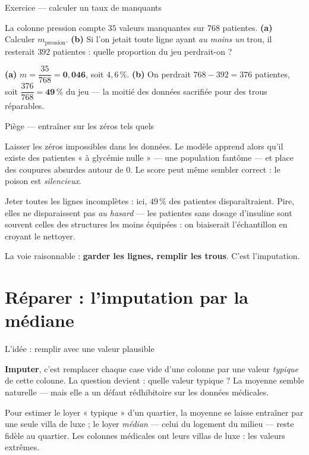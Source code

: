 \documentclass[aspectratio=169,11pt]{beamer}
\begin{document}
\begin{frame}{Exercice — calculer un taux de manquants}
\begin{ucadrec}[Énoncé]
{\small La colonne pression compte $35$ valeurs manquantes sur $768$ patientes. \textbf{(a)} Calculer $m_{\text{pression}}$. \textbf{(b)} Si l'on jetait toute ligne ayant \emph{au moins un} trou, il resterait $392$ patientes : quelle proportion du jeu perdrait-on ?}
\end{ucadrec}
\pause
\begin{ucadex}[Correction]
{\small \textbf{(a)} $m = \dfrac{35}{768} = \mathbf{0{,}046}$, soit $4{,}6\,\%$. \textbf{(b)} On perdrait $768 - 392 = 376$ patientes, soit $\dfrac{376}{768} = \mathbf{49\,\%}$ du jeu — la moitié des données sacrifiée pour des trous réparables.}
\end{ucadex}
\end{frame}

\begin{frame}{Piège — entraîner sur les zéros tels quels}
\begin{ucadpiege}
{\small Laisser les zéros impossibles dans les données. Le modèle apprend alors qu'il existe des patientes « à glycémie nulle » — une population fantôme — et place des coupures absurdes autour de $0$. Le score peut même sembler correct : le poison est \emph{silencieux}.}
\end{ucadpiege}
\begin{ucadpiege}
{\small Jeter toutes les lignes incomplètes : ici, $49\,\%$ des patientes disparaîtraient. Pire, elles ne disparaissent pas \emph{au hasard} — les patientes sans dosage d'insuline sont souvent celles des structures les moins équipées : on biaiserait l'échantillon en croyant le nettoyer.}
\end{ucadpiege}
{\small La voie raisonnable : \textbf{garder les lignes, remplir les trous}. C'est l'imputation.}
\end{frame}

\section{Réparer : l'imputation par la médiane}

\begin{frame}{L'idée : remplir avec une valeur plausible}
\begin{ucaddef}[Le principe]
{\small \textbf{Imputer}, c'est remplacer chaque case vide d'une colonne par une valeur \emph{typique} de cette colonne. La question devient : quelle valeur typique ? La moyenne semble naturelle — mais elle a un défaut rédhibitoire sur les données médicales.}
\end{ucaddef}
\begin{ucadfront}[Analogie]
{\small Pour estimer le loyer « typique » d'un quartier, la moyenne se laisse entraîner par une seule villa de luxe ; le loyer \emph{médian} — celui du logement du milieu — reste fidèle au quartier. Les colonnes médicales ont leurs villas de luxe : les valeurs extrêmes.}
\end{ucadfront}
\end{frame}
\end{document}
